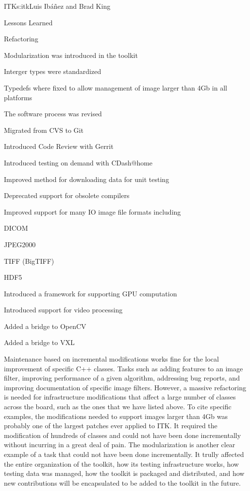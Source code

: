 \begin{aosachapter}{ITK}{s:itk}{Luis Ib\'{a}\~{n}ez and Brad King}
\begin{aosasect1}{Lessons Learned}
\begin{aosasect2}{Refactoring}
\begin{aosaitemize}
\item Modularization was introduced in the toolkit
\item Interger types were standardized
\item Typedefs where fixed to allow management of image larger than 4Gb in all platforms
\item The software process was revised
\begin{aosaitemize}
\item Migrated from CVS to Git
\item Introduced Code Review with Gerrit
\item Introduced testing on demand with CDash@home
\item Improved method for downloading data for unit testing
\end{aosaitemize}
\item Deprecated support for obsolete compilers
\item Improved support for many IO image file formats including
\begin{aosaitemize}
\item DICOM
\item JPEG2000
\item TIFF (BigTIFF)
\item HDF5
\end{aosaitemize}
\item Introduced a framework for supporting GPU computation
\item Introduced support for video processing
\begin{aosaitemize}
\item Added a bridge to OpenCV
\item Added a bridge to VXL
\end{aosaitemize}

\end{aosaitemize}

Maintenance based on incremental modifications works fine for the
local improvement of specific C++ classes. Tasks such as adding
features to an image filter, improving performance of a given
algorithm, addressing bug reports, and improving documentation of
specific image filters. However, a massive refactoring is needed for
infrastructure modifications that affect a large number of classes
across the board, such as the ones that we have listed above. To cite
specific examples, the modifications needed to support images larger
than 4Gb was probably one of the largest patches ever applied to ITK.
It required the modification of hundreds of classes and could not have
been done incrementally without incurring in a great deal of pain. The
modularization is another clear example of a task that could not have
been done incrementally. It trully affected the entire organization of
the toolkit, how its testing infrastructure works, how testing data
was managed, how the toolkit is packaged and distributed, and how new
contributions will be encapsulated to be added to the toolkit in the
future.


\end{aosasect2}
\end{aosasect1}
\end{aosachapter}
